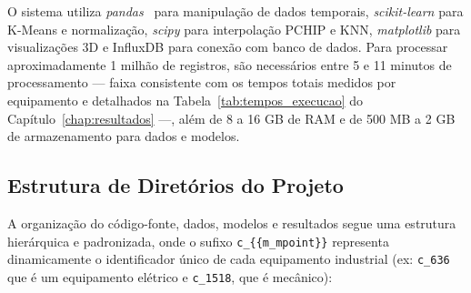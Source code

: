 O sistema utiliza \textit{pandas}~\cite{mckinney2010pandas} para manipulação de dados temporais, \textit{scikit-learn} para K-Means e normalização, \textit{scipy} para interpolação PCHIP e KNN, \textit{matplotlib} para visualizações 3D e InfluxDB para conexão com banco de dados. Para processar aproximadamente 1 milhão de registros, são necessários entre 5 e 11 minutos de processamento --- faixa consistente com os tempos totais medidos por equipamento e detalhados na Tabela~\ref{tab:tempos_execucao} do Capítulo~\ref{chap:resultados} ---, além de 8 a 16 GB de RAM e de 500 MB a 2 GB de armazenamento para dados e modelos.

\subsection{Estrutura de Diretórios do Projeto}

A organização do código-fonte, dados, modelos e resultados segue uma estrutura hierárquica e padronizada, onde o sufixo \texttt{c\_\{\{m\_mpoint\}\}} representa dinamicamente o identificador único de cada equipamento industrial (ex: \texttt{c\_636} que é um equipamento elétrico e \texttt{c\_1518}, que é mecânico):

